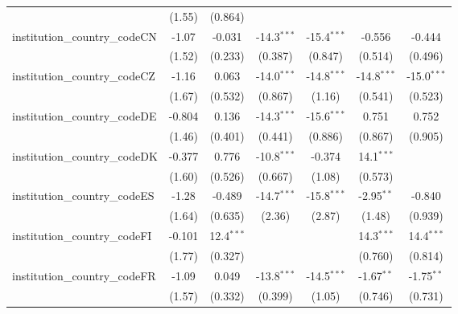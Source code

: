 \begin{tabular}{lcccccc}
                                         & (1.55)        & (0.864)       &               &               &               &   \\   
   institution\_country\_codeCN          & -1.07         & -0.031        & -14.3$^{***}$ & -15.4$^{***}$ & -0.556        & -0.444\\   
                                         & (1.52)        & (0.233)       & (0.387)       & (0.847)       & (0.514)       & (0.496)\\   
   institution\_country\_codeCZ          & -1.16         & 0.063         & -14.0$^{***}$ & -14.8$^{***}$ & -14.8$^{***}$ & -15.0$^{***}$\\   
                                         & (1.67)        & (0.532)       & (0.867)       & (1.16)        & (0.541)       & (0.523)\\   
   institution\_country\_codeDE          & -0.804        & 0.136         & -14.3$^{***}$ & -15.6$^{***}$ & 0.751         & 0.752\\   
                                         & (1.46)        & (0.401)       & (0.441)       & (0.886)       & (0.867)       & (0.905)\\   
   institution\_country\_codeDK          & -0.377        & 0.776         & -10.8$^{***}$ & -0.374        & 14.1$^{***}$  &   \\   
                                         & (1.60)        & (0.526)       & (0.667)       & (1.08)        & (0.573)       &   \\   
   institution\_country\_codeES          & -1.28         & -0.489        & -14.7$^{***}$ & -15.8$^{***}$ & -2.95$^{**}$  & -0.840\\   
                                         & (1.64)        & (0.635)       & (2.36)        & (2.87)        & (1.48)        & (0.939)\\   
   institution\_country\_codeFI          & -0.101        & 12.4$^{***}$  &               &               & 14.3$^{***}$  & 14.4$^{***}$\\   
                                         & (1.77)        & (0.327)       &               &               & (0.760)       & (0.814)\\   
   institution\_country\_codeFR          & -1.09         & 0.049         & -13.8$^{***}$ & -14.5$^{***}$ & -1.67$^{**}$  & -1.75$^{**}$\\   
                                         & (1.57)        & (0.332)       & (0.399)       & (1.05)        & (0.746)       & (0.731)\\   

\end{tabular}

